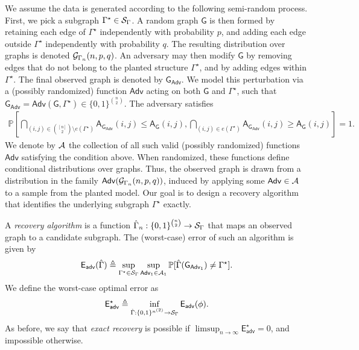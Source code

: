\documentclass[12pt]{article}
\newcommand{\adv}{\mathsf{{Adv}}}
\def\P{{\mathbb P}}
\newcommand{\calA}{{\cal A}}
\newcommand{\calG}{{\cal G}}
\newcommand{\calS}{{\cal S}}
\newcommand{\pp}[1]{\left[#1\right]}
\newcommand{\s}[1]{\mathsf{#1}}
\begin{document}
We assume the data is generated according to the following semi-random process. First, we pick a subgraph $\Gamma^\star\in\calS_\Gamma$. A random graph $\s{G}$ is then formed by retaining each edge of $\Gamma^\star$ independently with probability $p$, and adding each edge outside $\Gamma^\star$ independently with probability $q$. The resulting distribution over graphs is denoted $\calG_{\Gamma_n}(n,p,q)$. An adversary may then modify $\s{G}$ by removing edges that do not belong to the planted structure $\Gamma^\star$, and by adding edges within $\Gamma^\star$. The final observed graph is denoted by $\s{G}_{\adv}$. We model this perturbation via a (possibly randomized) function $\adv$ acting on both $\s{G}$ and $\Gamma^\star$, such that $\s{G}_{\adv} = \adv(\s{G},\Gamma^\star) \in \{0,1\}^{\binom{n}{2}}$. The adversary satisfies
\begin{align}
    \P\pp{\bigcap_{(i,j)\in\binom{[n]}{2}\setminus e(\Gamma^\star)}\s{A}_{\s{G}_{\adv}}(i,j)\leq \s{A}_{\s{G}}(i,j),\bigcap_{(i,j)\in e(\Gamma^\star)}\s{A}_{\s{G}_{\adv}}(i,j)\geq \s{A}_{\s{G}}(i,j)}=1.\label{eq:recovery_adversary}
\end{align}
We denote by $\calA$ the collection of all such valid (possibly randomized) functions $\adv$ satisfying the condition above. When randomized, these functions define conditional distributions over graphs. Thus, the observed graph is drawn from a distribution in the family $\s{Adv}(\calG_{\Gamma_n}(n,p,q))$, induced by applying some $\adv\in \calA$ to a sample from the planted model. Our goal is to design a recovery algorithm that identifies the underlying subgraph $\Gamma^\star$ exactly.

A \emph{recovery algorithm} is a function $\hat{\Gamma}_n: \{0,1\}^{\binom{n}{2}} \to \calS_\Gamma$ that maps an observed graph to a candidate subgraph. The (worst-case) error of such an algorithm is given by
\begin{align}
    \s{E}_{\s{adv}}(\hat{\Gamma}) \triangleq \sup_{\Gamma^\star\in\calS_\Gamma}\sup_{\adv_1 \in \calA_1} \P[\hat{\Gamma}(\s{G}_{\adv_1}) \neq \Gamma^\star].
\end{align}
We define the worst-case optimal error as
\begin{align}
    \s{E}_{\s{adv}}^{\star} \triangleq \inf_{\hat{\Gamma}:\{0,1\}^{n^{(2)}} \to \calS_\Gamma} \s{E}_{\s{adv}}(\phi).
\end{align}
As before, we say that \textit{exact recovery} is possible if $\limsup_{n \to \infty} \s{E}_{\s{adv}}^{\star} = 0$, and impossible otherwise.
\end{document}

